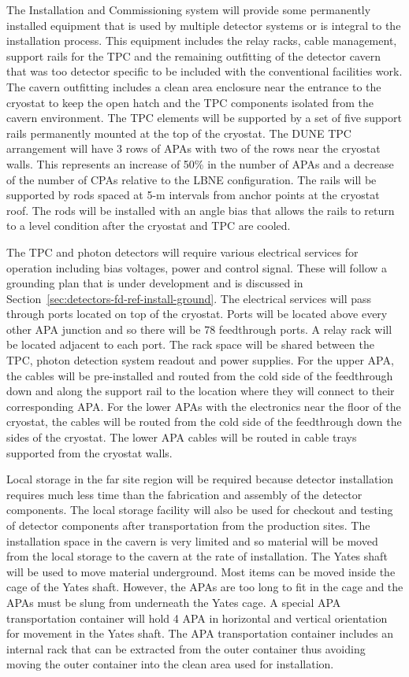 The Installation and Commissioning system will provide some
permanently installed equipment that is used by multiple detector
systems or is integral to the installation process. This equipment
includes the relay racks, cable management, support rails for the TPC
and the remaining outfitting of the detector cavern that was too
detector specific to be included with the conventional facilities
work. The cavern outfitting includes a clean area enclosure near the
entrance to the cryostat to keep the open hatch and the TPC components
isolated from the cavern environment. The TPC elements will be
supported by a set of five support rails permanently mounted at the
top of the cryostat. The DUNE TPC arrangement will have 3 rows of APAs
with two of the rows near the cryostat walls. This represents an
increase of 50\% in the number of APAs and a decrease of the number of
CPAs relative to the LBNE configuration. The rails will be supported
by rods spaced at 5-m intervals from anchor points at the cryostat
roof. The rods will be installed with an angle bias that allows the
rails to return to a level condition after the cryostat and TPC are
cooled.

The TPC and photon detectors will require various electrical services
for operation including bias voltages, power and control signal. These
will follow a grounding plan that is under development and is
discussed in Section~\ref{sec:detectors-fd-ref-install-ground}.  The
electrical services will pass through ports located on top of the
cryostat. Ports will be located above every other APA junction and so
there will be 78 feedthrough ports. A relay rack will be located
adjacent to each port. The rack space will be shared between the TPC,
photon detection system readout and power supplies. For the upper APA,
the cables will be pre-installed and routed from the cold side of the
feedthrough down and along the support rail to the location where they
will connect to their corresponding APA. For the lower APAs with the
electronics near the floor of the cryostat, the cables will be routed
from the cold side of the feedthrough down the sides of the
cryostat. The lower APA cables will be routed in cable trays supported
from the cryostat walls.

Local storage in the far site region will be required because detector
installation requires much less time than the fabrication and assembly
of the detector components. The local storage facility will also be
used for checkout and testing of detector components after
transportation from the production sites. The installation space in
the cavern is very limited and so material will be moved from the
local storage to the cavern at the rate of installation. The Yates
shaft will be used to move material underground. Most items can be
moved inside the cage of the Yates shaft. However, the APAs are too
long to fit in the cage and the APAs must be slung from underneath the
Yates cage. A special APA transportation container will hold 4 APA in
horizontal and vertical orientation for movement in the Yates shaft.
The APA transportation container includes an internal rack that can be
extracted from the outer container thus avoiding moving the outer
container into the clean area used for installation.

